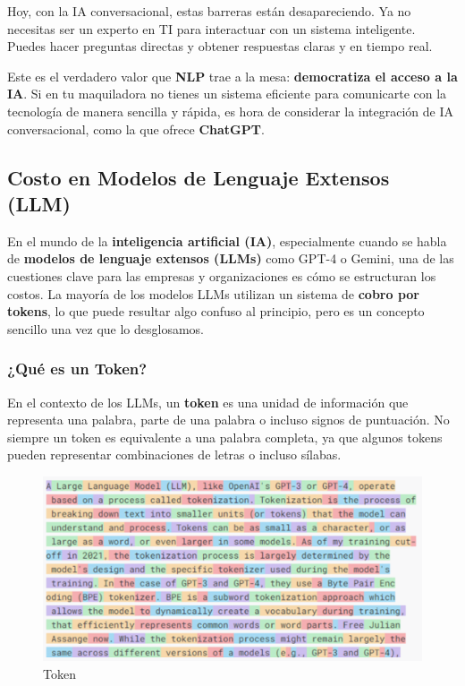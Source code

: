 \documentclass[
  10pt,
  letterpaper,
]{book}
\begin{document}
Hoy, con la IA conversacional, estas barreras están desapareciendo. Ya
no necesitas ser un experto en TI para interactuar con un sistema
inteligente. Puedes hacer preguntas directas y obtener respuestas claras
y en tiempo real.

Este es el verdadero valor que \textbf{NLP} trae a la mesa:
\textbf{democratiza el acceso a la IA}. Si en tu maquiladora no tienes
un sistema eficiente para comunicarte con la tecnología de manera
sencilla y rápida, es hora de considerar la integración de IA
conversacional, como la que ofrece \textbf{ChatGPT}.

\subsection{Costo en Modelos de Lenguaje Extensos
(LLM)}\label{costo-en-modelos-de-lenguaje-extensos-llm}

En el mundo de la \textbf{inteligencia artificial (IA)}, especialmente
cuando se habla de \textbf{modelos de lenguaje extensos (LLMs)} como
GPT-4 o Gemini, una de las cuestiones clave para las empresas y
organizaciones es cómo se estructuran los costos. La mayoría de los
modelos LLMs utilizan un sistema de \textbf{cobro por tokens}, lo que
puede resultar algo confuso al principio, pero es un concepto sencillo
una vez que lo desglosamos.

\subsubsection{\texorpdfstring{\textbf{¿Qué es un
Token?}}{¿Qué es un Token?}}\label{quuxe9-es-un-token}

En el contexto de los LLMs, un \textbf{token} es una unidad de
información que representa una palabra, parte de una palabra o incluso
signos de puntuación. No siempre un token es equivalente a una palabra
completa, ya que algunos tokens pueden representar combinaciones de
letras o incluso sílabas.

\begin{figure}[H]

{\centering \includegraphics{Img/token.png}

}

\caption{Token}

\end{figure}%
\end{document}
